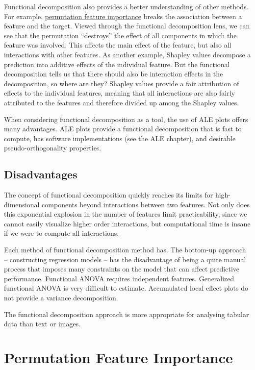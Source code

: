 \documentclass[12pt,]{krantz}
\begin{document}
Functional decomposition also provides a better understanding of other
methods. For example, \protect\hyperlink{feature-importance}{permutation
feature importance} breaks the association between a feature and the
target. Viewed through the functional decomposition lens, we can see
that the permutation ``destroys'' the effect of all components in which
the feature was involved. This affects the main effect of the feature,
but also all interactions with other features. As another example,
Shapley values decompose a prediction into additive effects of the
individual feature. But the functional decomposition tells us that there
should also be interaction effects in the decomposition, so where are
they? Shapley values provide a fair attribution of effects to the
individual features, meaning that all interactions are also fairly
attributed to the features and therefore divided up among the Shapley
values.

When considering functional decomposition as a tool, the use of ALE
plots offers many advantages. ALE plots provide a functional
decomposition that is fast to compute, has software implementations (see
the ALE chapter), and desirable pseudo-orthogonality properties.

\subsection{Disadvantages}\label{disadvantages-8}

The concept of functional decomposition quickly reaches its limits for
high-dimensional components beyond interactions between two features.
Not only does this exponential explosion in the number of features limit
practicability, since we cannot easily visualize higher order
interactions, but computational time is insane if we were to compute all
interactions.

Each method of functional decomposition method has. The bottom-up
approach -- constructing regression models -- has the disadvantage of
being a quite manual process that imposes many constraints on the model
that can affect predictive performance. Functional ANOVA requires
independent features. Generalized functional ANOVA is very difficult to
estimate. Accumulated local effect plots do not provide a variance
decomposition.

The functional decomposition approach is more appropriate for analysing
tabular data than text or images.

\newpage

\hypertarget{feature-importance}{\section{Permutation Feature
Importance}\label{feature-importance}}
\end{document}
